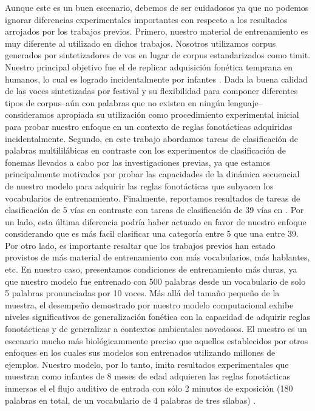 {Aunque este es un buen escenario, debemos de ser cuidadosos ya que no podemos ignorar diferencias experimentales importantes con respecto a los resultados arrojados por los trabajos previos. Primero, nuestro material de entrenamiento es muy diferente  al utilizado en dichos trabajos. Nosotros utilizamos corpus generados por sintetizadores de vos en lugar de corpus estandarizados como \gls{timit}.
Nuestro principal objetivo fue el de replicar adquisición fonética temprana en humanos, lo cual es logrado incidentalmente por infantes \cite{Saffran1996StatisticalLB}.
Dada la buena calidad de las voces sintetizadas por \gls{festival}  \cite{festival2014} y su flexibilidad para componer diferentes tipos de corpus--aún con palabras que no existen en ningún lenguaje--consideramos apropiada su utilización como procedimiento experimental inicial para probar nuestro enfoque en un contexto de reglas fonotácticas adquiridas incidentalmente.
Segundo, en este trabajo abordamos tareas de clasificación de palabras multililábicas en contraste con los experimentos de clasificación de fonemas llevados a cabo por las investigaciones previas, ya que estamos principalmente motivados por probar las capacidades de la dinámica secuencial de nuestro modelo para adquirir las reglas fonotácticas que subyacen los vocabularios de entrenamiento.
Finalmente, reportamos resultados de tareas de clasificación de 5 vías en contraste con tareas de clasificación de 39 vías en \cite{Lee:2009:UFL:2984093.2984217}.
Por un lado, esta última diferencia podría haber actuado en favor de nuestro enfoque considerando que es más facil clasificar una categoría entre 5 que una entre 39.
Por otro lado, es importante resaltar que los trabajos previos han estado provistos de más material de entrenamiento con más vocabularios, más hablantes, etc.
En nuestro caso, presentamos condiciones de entrenamiento más duras, ya que nuestro modelo fue entrenado con 500 palabras desde un vocabulario de solo 5 palabras pronunciadas por 10 voces.
Más allá del tamaño pequeño de la muestra, el desempeño demostrado por nuestro modelo computacional exhibe niveles significativos de generalización fonética con la capacidad de adquirir reglas fonotácticas y de generalizar a contextos ambientales novedosos. El nuestro es un escenario mucho más biológicammente preciso que aquellos establecidos por otros enfoques en los cuales sus modelos son entrenados utilizando millones de ejemplos. Nuestro modelo, por lo tanto, imita resultados experimentales que muestran como infantes de 8 meses de edad adquieren las reglas fonotácticas inmersas el el flujo auditivo de entrada con sólo 2 minutos de exposición (180 palabras en total, de un vocabulario de 4 palabras de tres sílabas) \cite{Saffran1996StatisticalLB}.

}
